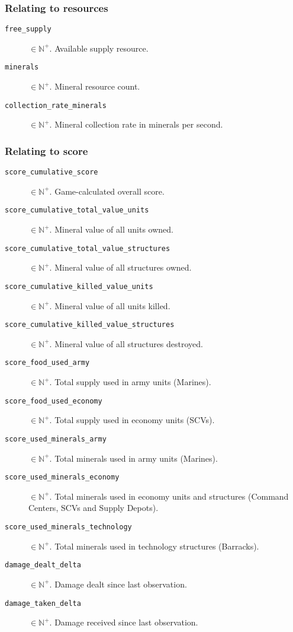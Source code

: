 \subsubsection*{Relating to resources}
\begin{description}
    \item[\texttt{free\_supply}] $\in \mathbb{N}^+$. Available supply resource.
    \item[\texttt{minerals}] $\in \mathbb{N}^+$. Mineral resource count.
    \item[\texttt{collection\_rate\_minerals}] $\in \mathbb{N}^+$. Mineral collection rate in minerals per second.
\end{description}

\subsubsection*{Relating to score}
\begin{description}
    \item[\texttt{score\_cumulative\_score}] $\in \mathbb{N}^+$. Game-calculated overall score.
    \item[\texttt{score\_cumulative\_total\_value\_units}] $\in \mathbb{N}^+$. Mineral value of all units owned.
    \item[\texttt{score\_cumulative\_total\_value\_structures}] $\in \mathbb{N}^+$. Mineral value of all structures owned.
    \item[\texttt{score\_cumulative\_killed\_value\_units}] $\in \mathbb{N}^+$. Mineral value of all units killed.
    \item[\texttt{score\_cumulative\_killed\_value\_structures}] $\in \mathbb{N}^+$. Mineral value of all structures destroyed.
    \item[\texttt{score\_food\_used\_army}] $\in \mathbb{N}^+$. Total supply used in army units (Marines).
    \item[\texttt{score\_food\_used\_economy}] $\in \mathbb{N}^+$. Total supply used in economy units (SCVs).
    \item[\texttt{score\_used\_minerals\_army}] $\in \mathbb{N}^+$. Total minerals used in army units (Marines).
    \item[\texttt{score\_used\_minerals\_economy}] $\in \mathbb{N}^+$. Total minerals used in economy units and structures (Command Centers, SCVs and Supply Depots).
    \item[\texttt{score\_used\_minerals\_technology}] $\in \mathbb{N}^+$. Total minerals used in technology structures (Barracks).
    \item[\texttt{damage\_dealt\_delta}] $\in \mathbb{N}^+$. Damage dealt since last observation.
    \item[\texttt{damage\_taken\_delta}] $\in \mathbb{N}^+$. Damage received since last observation.
\end{description}

